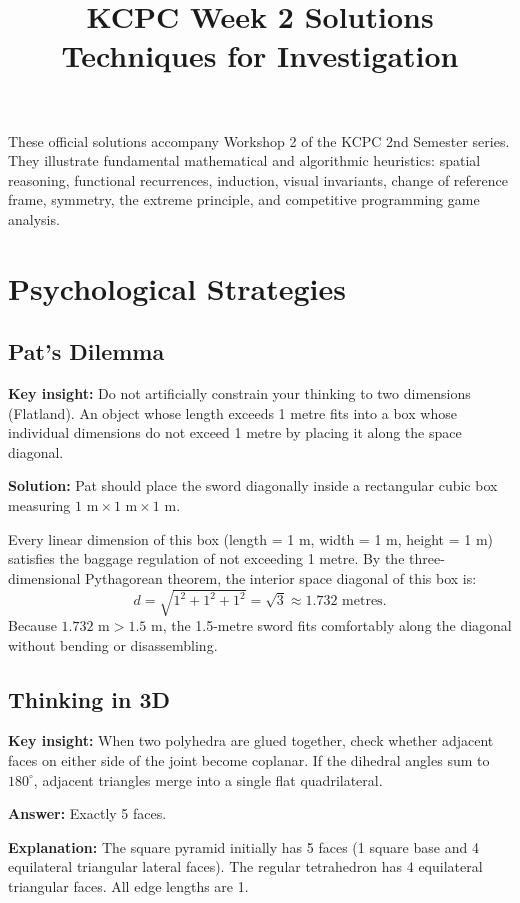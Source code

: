 \documentclass[12pt]{article}
\title{KCPC Week 2 Solutions\\Techniques for Investigation}
\author{}
\date{}
\newcommand{\insight}[1]{\par\medskip\noindent\textbf{Key insight:} #1}
\begin{document}
\maketitle
\thispagestyle{fancy}

\noindent
These official solutions accompany Workshop 2 of the KCPC 2nd Semester series. They illustrate fundamental mathematical and algorithmic heuristics: spatial reasoning, functional recurrences, induction, visual invariants, change of reference frame, symmetry, the extreme principle, and competitive programming game analysis.

\section{Psychological Strategies}

\subsection{Pat's Dilemma}

\insight{Do not artificially constrain your thinking to two dimensions (Flatland). An object whose length exceeds 1 metre fits into a box whose individual dimensions do not exceed 1 metre by placing it along the space diagonal.}

\textbf{Solution:}
Pat should place the sword diagonally inside a rectangular cubic box measuring $1\text{ m} \times 1\text{ m} \times 1\text{ m}$.

Every linear dimension of this box (length = 1 m, width = 1 m, height = 1 m) satisfies the baggage regulation of not exceeding 1 metre. By the three-dimensional Pythagorean theorem, the interior space diagonal of this box is:
\[
d = \sqrt{1^2 + 1^2 + 1^2} = \sqrt{3} \approx 1.732\text{ metres}.
\]
Because $1.732\text{ m} > 1.5\text{ m}$, the 1.5-metre sword fits comfortably along the diagonal without bending or disassembling.

\subsection{Thinking in 3D}

\insight{When two polyhedra are glued together, check whether adjacent faces on either side of the joint become coplanar. If the dihedral angles sum to $180^\circ$, adjacent triangles merge into a single flat quadrilateral.}

\textbf{Answer:} Exactly 5 faces.

\textbf{Explanation:}
The square pyramid initially has 5 faces (1 square base and 4 equilateral triangular lateral faces). The regular tetrahedron has 4 equilateral triangular faces. All edge lengths are 1.
\end{document}
